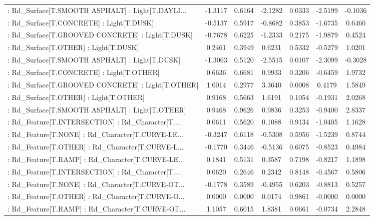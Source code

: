 \begin{longtable}{p{4cm}cccccc}
 : Rd\_Surface[T.SMOOTH ASPHALT] : Light[T.DAYLI... & -1.3117 &    0.6164 & -2.1282 &       0.0333 & -2.5199 & -0.1036 \\
 : Rd\_Surface[T.CONCRETE] : Light[T.DUSK]          & -0.5137 &    0.5917 & -0.8682 &       0.3853 & -1.6735 &  0.6460 \\
 : Rd\_Surface[T.GROOVED CONCRETE] : Light[T.DUSK]  & -0.7678 &    0.6225 & -1.2333 &       0.2175 & -1.9879 &  0.4524 \\
 : Rd\_Surface[T.OTHER] : Light[T.DUSK]             &  0.2461 &    0.3949 &  0.6231 &       0.5332 & -0.5279 &  1.0201 \\
 : Rd\_Surface[T.SMOOTH ASPHALT] : Light[T.DUSK]    & -1.3063 &    0.5120 & -2.5515 &       0.0107 & -2.3099 & -0.3028 \\
 : Rd\_Surface[T.CONCRETE] : Light[T.OTHER]         &  0.6636 &    0.6681 &  0.9933 &       0.3206 & -0.6459 &  1.9732 \\
 : Rd\_Surface[T.GROOVED CONCRETE] : Light[T.OTHER] &  1.0014 &    0.2977 &  3.3640 &       0.0008 &  0.4179 &  1.5849 \\
 : Rd\_Surface[T.OTHER] : Light[T.OTHER]            &  0.9168 &    0.5663 &  1.6191 &       0.1054 & -0.1931 &  2.0268 \\
 : Rd\_Surface[T.SMOOTH ASPHALT] : Light[T.OTHER]   &  0.9468 &    0.9626 &  0.9836 &       0.3253 & -0.9400 &  2.8337 \\
 : Rd\_Feature[T.INTERSECTION] : Rd\_Character[T.... &  0.0611 &    0.5620 &  0.1088 &       0.9134 & -1.0405 &  1.1628 \\
 : Rd\_Feature[T.NONE] : Rd\_Character[T.CURVE-LE... & -0.3247 &    0.6118 & -0.5308 &       0.5956 & -1.5239 &  0.8744 \\
 : Rd\_Feature[T.OTHER] : Rd\_Character[T.CURVE-L... & -0.1770 &    0.3446 & -0.5136 &       0.6075 & -0.8523 &  0.4984 \\
 : Rd\_Feature[T.RAMP] : Rd\_Character[T.CURVE-LE... &  0.1841 &    0.5131 &  0.3587 &       0.7198 & -0.8217 &  1.1898 \\
 : Rd\_Feature[T.INTERSECTION] : Rd\_Character[T.... &  0.0620 &    0.2646 &  0.2342 &       0.8148 & -0.4567 &  0.5806 \\
 : Rd\_Feature[T.NONE] : Rd\_Character[T.CURVE-OT... & -0.1778 &    0.3589 & -0.4955 &       0.6203 & -0.8813 &  0.5257 \\
 : Rd\_Feature[T.OTHER] : Rd\_Character[T.CURVE-O... &  0.0000 &    0.0000 &  0.0174 &       0.9861 & -0.0000 &  0.0000 \\
 : Rd\_Feature[T.RAMP] : Rd\_Character[T.CURVE-OT... &  1.1057 &    0.6015 &  1.8381 &       0.0661 & -0.0734 &  2.2848 \\

\end{longtable}
